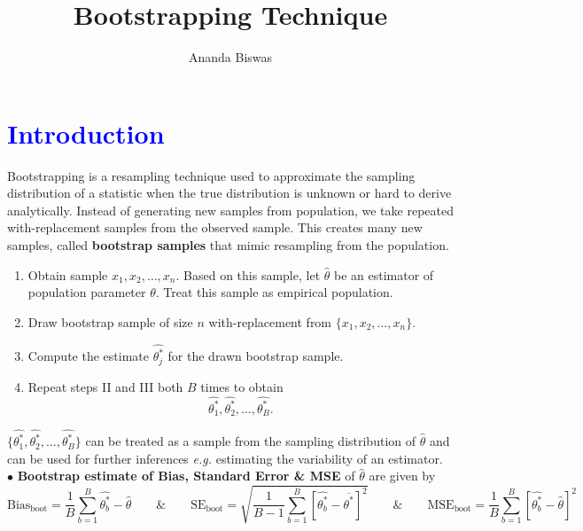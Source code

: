 \documentclass[11pt, a4paper]{article}\usepackage[]{graphicx}\usepackage[]{xcolor}
\title{Bootstrapping Technique}
\author{{\fontsize{22}{20} \benyorithafont Ananda Biswas}}
\date{}
\begin{document}
\maketitle


\section*{\faArrowAltCircleRight[regular] \textcolor{blue}{Introduction}}

Bootstrapping is a resampling technique used to approximate the sampling distribution of a statistic when the true distribution is unknown or hard to derive analytically. Instead of generating new samples from population, we take repeated with-replacement samples from the observed sample. This creates many new samples, called \textbf{bootstrap samples} that mimic resampling from the population.

\begin{enumerate}[Step I.]
\item Obtain sample $x_1, x_2, \ldots, x_n$. Based on this sample, let $\hat{\theta}$ be an estimator of population parameter $\theta$. Treat this sample as empirical population.

\item Draw bootstrap sample of size $n$ with-replacement from $\{x_1, x_2, \ldots, x_n\}$.

\item Compute the estimate $\widehat{\theta_{j}^{*}}$ for the drawn bootstrap sample.

\item Repeat steps II and III both $B$ times to obtain $$\widehat{\theta_{1}^{*}}, \widehat{\theta_{2}^{*}}, \ldots, \widehat{\theta_{B}^{*}}.$$
\end{enumerate}

$\{\widehat{\theta_{1}^{*}}, \widehat{\theta_{2}^{*}}, \ldots, \widehat{\theta_{B}^{*}}\}$ can be treated as a sample from the sampling distribution of $\hat{\theta}$ and can be used for further inferences \textit{e.g.} estimating the variability of an estimator. \\[0.3em]

$\bullet$ \textbf{Bootstrap estimate of Bias, Standard Error \& MSE} of $\hat{\theta}$ are given by $$\text{Bias}_{\text{boot}} = \dfrac{1}{B} \sum \limits_{b = 1}^{B} \widehat{\theta_{b}^{*}} - \hat{\theta} \qquad \& \qquad \text{SE}_{\text{boot}} = \sqrt{\dfrac{1}{B-1} \sum \limits_{b = 1}^{B} \left[\widehat{\theta_{b}^{*}} - \overline{\theta^*}\right]^2} \qquad \& \qquad \text{MSE}_{\text{boot}} = \dfrac{1}{B} \sum \limits_{b = 1}^{B} \left[\widehat{\theta_{b}^{*}} - \hat{\theta}\right]^2$$
\end{document}
